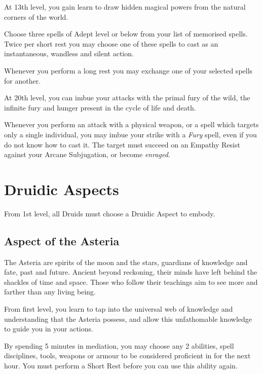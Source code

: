 {
	At 13th level, you gain learn to draw hidden magical powers from the natural corners of the world. 
	
	Choose three spells of Adept level or below from your list of memorised spells. Twice per short rest you may choose one of these spells to cast as an instantaneous, wandless and silent action.
	
	Whenever you perform a long rest you may exchange one of your selected spells for another.  
}

{
	At 20th level, you can imbue your attacks with the primal fury of the wild, the infinite fury and hunger present in the cycle of life and death. 
	
	Whenever you perform an attack with a physical weapon, or a spell which targets only a single individual, you may imbue your strike with a {\it Fury} spell, even if you do not know how to cast it. The target must succeed on an Empathy Resist against your Arcane Subjugation, or become {\it enraged}.
}

\section*{Druidic Aspects}

From 1st level, all Druids must choose a Druidic Aspect to embody. 


\subsection{Aspect of the Asteria}

The Asteria are spirits of the moon and the stars, guardians of knowledge and fate, past and future. Ancient beyond reckoning, their minds have left behind the shackles of time and space. Those who follow their teachings aim to see more and farther than any living being. 

{
	From first level, you learn to tap into the universal web of knowledge and understanding that the Asteria possess, and allow this unfathomable knowledge to guide you in your actions. 
	
	By spending 5 minutes in mediation, you may choose any 2 abilities, spell disciplines, tools, weapons or armour to be considered proficient in for the next hour. You must perform a Short Rest before you can use this ability again. 
}


